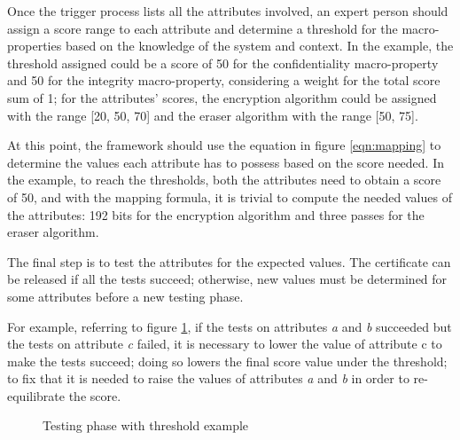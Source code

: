 Once the trigger process lists all the attributes involved, an expert person should assign a score range to each attribute and determine a threshold for the macro-properties based on the knowledge of the system and context.
In the example, the threshold assigned could be a score of 50 for the confidentiality macro-property and 50 for the integrity macro-property, considering a weight for the total score sum of 1; for the attributes' scores, the encryption algorithm could be assigned with the range [20, 50, 70] and the eraser algorithm with the range [50, 75].

At this point, the framework should use the equation in figure \ref{eqn:mapping} to determine the values each attribute has to possess based on the score needed. In the example, to reach the thresholds, both the attributes need to obtain a score of 50, and with the mapping formula, it is trivial to compute the needed values of the attributes: 192 bits for the encryption algorithm and three passes for the eraser algorithm.

The final step is to test the attributes for the expected values. The certificate can be released if all the tests succeed; otherwise, new values must be determined for some attributes before a new testing phase. 

For example, referring to figure \ref{fig:thex}, if the tests on attributes \textit{a} and \textit{b} succeeded but the tests on attribute \textit{c} failed, it is necessary to lower the value of attribute c to make the tests succeed; doing so lowers the final score value under the threshold; to fix that it is needed to raise the values of attributes \textit{a} and \textit{b} in order to re-equilibrate the score.

\begin{figure}[htb]
    \centering
    \caption{Testing phase with threshold example}
    \label{fig:thex}
\end{figure}

